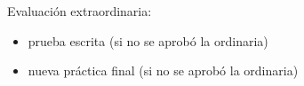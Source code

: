 \documentclass[a4paper,12pt]{report}
\begin{document}
Evaluación extraordinaria:

\begin{itemize}
\item prueba escrita (si no se aprobó la ordinaria)
\item nueva práctica final (si no se aprobó la ordinaria)
\end{itemize}









\end{document}
